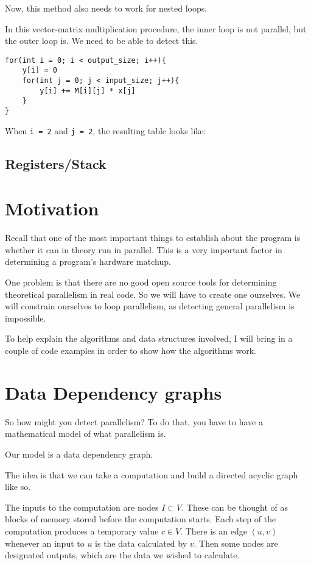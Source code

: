 \documentclass[12pt,twoside]{reedthesis}
\begin{document}
		Now, this method also needs to work for nested loops.  
		
		In this vector-matrix multiplication procedure, the inner loop is not parallel, but the outer loop is. We need to be able to detect this.
		
		\begin{lstlisting}
for(int i = 0; i < output_size; i++){
	y[i] = 0
	for(int j = 0; j < input_size; j++){
		y[i] += M[i][j] * x[j]
	}
}
		\end{lstlisting}
		
		When \texttt{i = 2} and \texttt{j = 2}, the resulting table looks like:
		
		
		\subsection{Registers/Stack}
		
			
	\section{Motivation}
	
		Recall that one of the most important things to establish about the program is whether it can in theory run in parallel. This is a very important factor in determining a program's hardware matchup.

		One problem is that there are no good open source tools for determining theoretical parallelism in real code. So we will have to create one ourselves. We will constrain ourselves to loop parallelism, as detecting general parallelism is impossible. 
		
		To help explain the algorithms and data structures involved, I will bring in a couple of code examples in order to show how the algorithms work. 
		


	\section{Data Dependency graphs}
		So how might you detect parallelism? To do that, you have to have a mathematical model of what parallelism is.

		Our model is a data dependency graph.

		The idea is that we can take a computation and build a directed acyclic graph like so.

		The inputs to the computation are nodes $I \subset V$. These can be thought of as blocks of memory stored before the computation starts. Each step of the computation produces a temporary value $c \in V$. There is an edge $(u,v)$ whenever an input to $u$ is the data calculated by $v$. Then some nodes are designated outputs, which are the data we wished to calculate.
\end{document}
